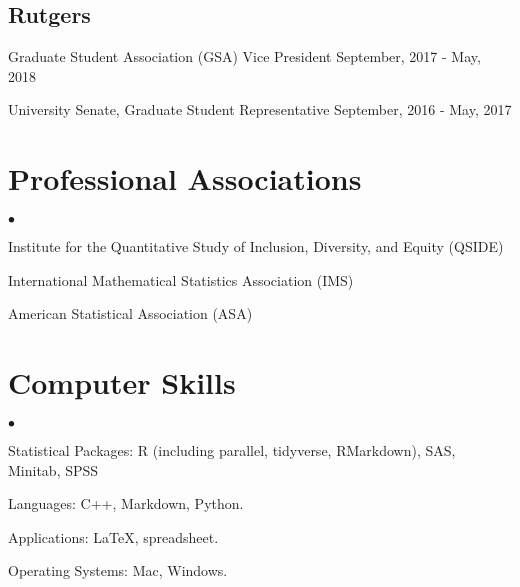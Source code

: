 \documentclass[margin,line]{res}
\newenvironment{list1}{
  \begin{list}{\ding{113}}{%
      \setlength{\itemsep}{0in}
      \setlength{\parsep}{0in} \setlength{\parskip}{0in}
      \setlength{\topsep}{0in} \setlength{\partopsep}{0in} 
      \setlength{\leftmargin}{0.17in}}}{\end{list}}
\newenvironment{list2}{
  \begin{list}{$\bullet$}{%
      \setlength{\itemsep}{0in}
      \setlength{\parsep}{0in} \setlength{\parskip}{0in}
      \setlength{\topsep}{0in} \setlength{\partopsep}{0in} 
      \setlength{\leftmargin}{0.2in}}}{\end{list}}
\begin{document}
\begin{resume}
\vspace*{-0.7cm}
\subsection{Rutgers}
\begin{list1}
\item[] {Graduate Student Association (GSA) Vice President} \hfill {September, 2017 - May, 2018}
\item[] {University Senate, Graduate Student Representative} \hfill {September, 2016 - May, 2017}
\end{list1}

\section{\sc Professional Associations} 
\begin{list2}
\item Institute for the Quantitative Study of Inclusion, Diversity, and Equity (QSIDE)  
\item International Mathematical Statistics Association (IMS)
\item American Statistical Association (ASA)
\end{list2}

\section{\sc Computer Skills} 
\begin{list2}
\item Statistical Packages:  R (including parallel, tidyverse, RMarkdown), SAS, Minitab, SPSS
\item Languages:  C++, Markdown, Python.
\item Applications:  \LaTeX, spreadsheet.
\item Operating Systems:  Mac, Windows.\\ 
\end{list2}




\end{resume}
\end{document}
